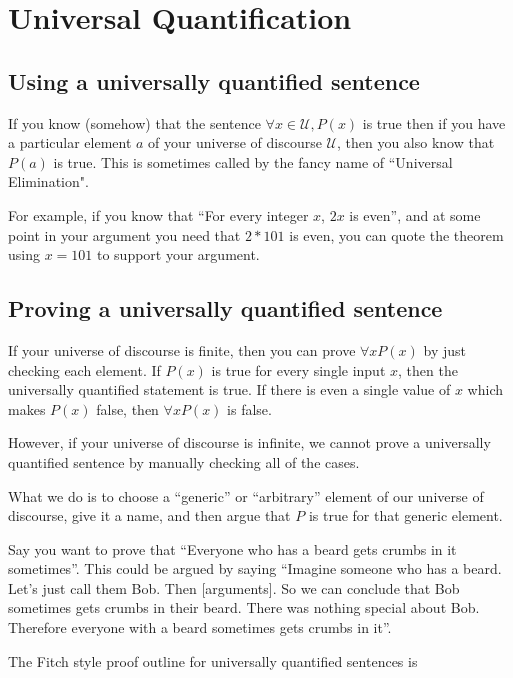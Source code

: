 \documentclass{article}
\begin{document}
\newpage

\section{Universal Quantification}

\subsection{Using a universally quantified sentence}

If you know (somehow) that the sentence $\forall x \in \mathcal{U}, P(x)$ is true then if you have a particular element $a$ of your universe of discourse $\mathcal{U}$, then you also know that $P(a)$ is true.  This is sometimes called by the fancy name of ``Universal Elimination".

For example, if you know that ``For every integer $x$, $2x$ is even'', and at some point in your argument you need that $2*101$ is even, you can  quote the theorem using $x = 101$ to support your argument.

\subsection{Proving a universally quantified sentence}

If your universe of discourse is finite, then you can prove $\forall x P(x)$ by just checking each element.  If $P(x)$ is true for every single input $x$, then the universally quantified statement is true.  If there is even a single value of $x$ which makes $P(x)$ false, then $\forall x P(x)$ is false.

However, if your universe of discourse is infinite, we cannot prove a universally quantified sentence by manually checking all of the cases.  

What we do is to choose a ``generic'' or ``arbitrary'' element of our universe of discourse, give it a name, and then argue that $P$ is true for that generic element.

Say you want to prove that ``Everyone who has a beard gets crumbs in it sometimes''.  This could be argued by saying ``Imagine someone who has a beard. Let's just call them Bob.  Then [arguments].  So we can conclude that Bob sometimes gets crumbs in their beard.  There was nothing special about Bob.  Therefore everyone with a beard sometimes gets crumbs in it''.

The Fitch style proof outline for universally quantified sentences is 
\end{document}
